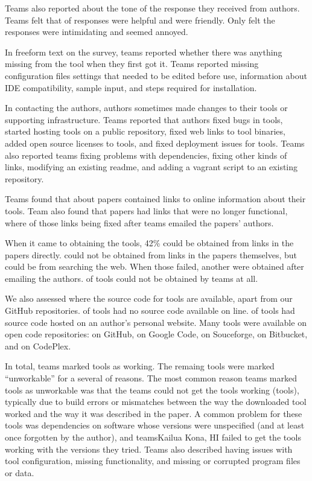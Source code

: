 \documentclass{sig-alternate-05-2015}
\begin{document}
Teams also reported about the tone of the response they received from 
authors.
Teams felt that \emailsHelpful of responses were helpful and
\emailsFriendly were friendly.
Only \emailsIntimidating felt the responses were intimidating
and \emailsAnnoyed seemed annoyed.

In freeform text on the survey, teams reported whether 
there was anything missing from the tool when they first
got it.
Teams reported missing configuration files
settings that needed to be edited before use, 
information about IDE compatibility,
sample input,
and steps required for installation.                                                                                                               

In contacting the authors, authors sometimes made
changes to their tools or supporting infrastructure.
Teams reported that authors fixed bugs in \contactFixBug tools,
started hosting \contactHosted tools on a public repository,
fixed web links to \contactFixLink tool binaries,
added open source licenses to \contactOSSed tools,
and fixed deployment issues for \contactFixDepl tools.
Teams also reported teams fixing problems with dependencies,
fixing other kinds of links, 
modifying an existing readme,
and adding a vagrant script to an existing repository.

Teams found that about \papersWithLinks papers
contained links to online information about their tools.
Team also found that \papersWithLinksDead papers
had links that were no longer functional,
where \papersWithLinksRevived of those links
being fixed after teams emailed the papers' authors.

When it came to obtaining the tools, 42\%
could be obtained from links in 
the papers directly.
\obtainGoogle could not be obtained from
links in the papers themselves, but could be
from searching the web.
When those failed, another \obtainEmail were 
obtained after emailing the authors.
\obtainNot of tools could not be obtained
by teams at all.

We also assessed where the source code for tools are available,
apart from our GitHub repositories.
\onlineNotAvail of tools had no source code available 
on line.
\onlinePersonalSite of tools had source code hosted
on an author's personal website.
Many tools were available on open code repositories:
\onlineGitHub on GitHub, 
\onlineGcode on Google Code,
\onlineSourceforge on Souceforge,
\onlineBitbucket on Bitbucket,
and \onlineCodeplex on CodePlex.


In total, teams marked \working tools as working.
The remaing tools were marked ``unworkable'' for a 
several of reasons.
The most common reason teams marked tools as unworkable
was that the teams could not get the tools 
working (\unworkCouldntWorkIt tools),
typically due to build errors or mismatches between
the way the downloaded tool worked and the way 
it was described in the paper.
A common problem for these tools was dependencies on
software whose versions were unspecified 
(and at least once forgotten by the author), and teamsKailua Kona, HI
failed to get the tools working with the versions they
tried.
Teams also described having issues with 
tool configuration,
missing functionality, and
missing or corrupted program files or data.
\end{document}
